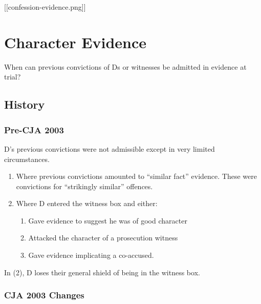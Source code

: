 \documentclass[
]{article}
\providecommand{\tightlist}{%
  \setlength{\itemsep}{0pt}\setlength{\parskip}{0pt}}
\begin{document}
{[}{[}confession-evidence.png{]}{]}

\hypertarget{character-evidence}{%
\section{Character Evidence}\label{character-evidence}}

When can previous convictions of Ds or witnesses be admitted in evidence
at trial?

\hypertarget{history}{%
\subsection{History}\label{history}}

\hypertarget{pre-cja-2003}{%
\subsubsection{Pre-CJA 2003}\label{pre-cja-2003}}

D's previous convictions were not admissible except in very limited
circumstances.

\begin{enumerate}
\def\labelenumi{\arabic{enumi}.}
\tightlist
\item
  Where previous convictions amounted to ``similar fact'' evidence.
  These were convictions for ``strikingly similar'' offences.
\item
  Where D entered the witness box and either:

  \begin{enumerate}
  \def\labelenumii{\arabic{enumii}.}
  \tightlist
  \item
    Gave evidence to suggest he was of good character
  \item
    Attacked the character of a prosecution witness
  \item
    Gave evidence implicating a co-accused.
  \end{enumerate}
\end{enumerate}

In (2), D loses their general shield of being in the witness box.

\hypertarget{cja-2003-changes}{%
\subsubsection{CJA 2003 Changes}\label{cja-2003-changes}}
\end{document}
